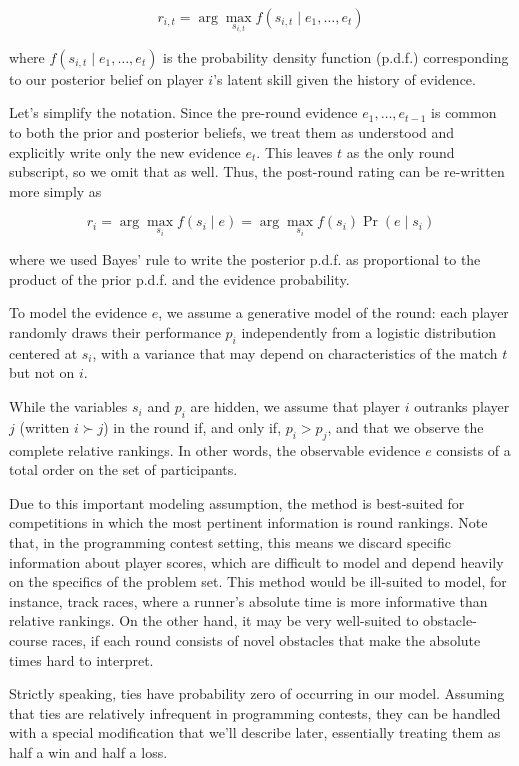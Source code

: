 \documentclass{article}
\begin{document}
\[r_{i,t} = \arg\max_{s_{i,t}} f(s_{i,t} \mid e_1,\ldots,e_t)\]

where $f(s_{i,t} \mid e_1,\ldots,e_t)$ is the probability density function (p.d.f.) corresponding to our posterior belief on player $i$'s latent skill given the history of evidence.

Let's simplify the notation. Since the pre-round evidence $e_1,\ldots,e_{t-1}$ is common to both the prior and posterior beliefs, we treat them as understood and explicitly write only the new evidence $e_t$. This leaves $t$ as the only round subscript, so we omit that as well. Thus, the post-round rating can be re-written more simply as

\[r_i = \arg\max_{s_i} f(s_i \mid e) = \arg\max_{s_i} f(s_i) \Pr(e \mid s_i)\]

where we used Bayes' rule to write the posterior p.d.f. as proportional to the product of the prior p.d.f. and the evidence probability.

To model the evidence $e$, we assume a generative model of the round: each player randomly draws their performance $p_i$ independently from a logistic distribution centered at $s_i$, with a variance that may depend on characteristics of the match $t$ but not on $i$.

While the variables $s_i$ and $p_i$ are hidden, we assume that player $i$ outranks player $j$ (written $i \succ j$) in the round if, and only if, $p_i > p_j$, and that we observe the complete relative rankings. In other words, the observable evidence $e$ consists of a total order on the set of participants.

Due to this important modeling assumption, the method is best-suited for competitions in which the most pertinent information is round rankings. Note that, in the programming contest setting, this means we discard specific information about player scores, which are difficult to model and depend heavily on the specifics of the problem set. This method would be ill-suited to model, for instance, track races, where a runner's absolute time is more informative than relative rankings. On the other hand, it may be very well-suited to obstacle-course races, if each round consists of novel obstacles that make the absolute times hard to interpret.

Strictly speaking, ties have probability zero of occurring in our model. Assuming that ties are relatively infrequent in programming contests, they can be handled with a special modification that we'll describe later, essentially treating them as half a win and half a loss.
\end{document}
